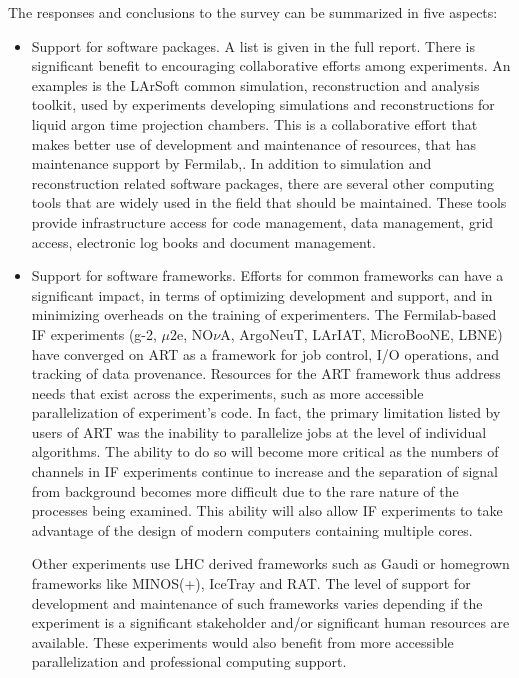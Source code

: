 The responses and conclusions to the survey can be summarized in five aspects:  
\begin{itemize}

\item Support for software packages. A list is given in the full report. There
is significant benefit to encouraging collaborative efforts among experiments.
An examples is the LArSoft common simulation, reconstruction and
analysis toolkit, used by experiments developing simulations and
reconstructions for liquid argon time projection chambers. This is a
collaborative effort that makes better use of development and maintenance of resources, that has maintenance support by Fermilab,. 
In addition to simulation and reconstruction related software packages, there are
several other computing tools that are widely used in the field that should be
maintained.  These tools provide infrastructure access for code management,
data management, grid access, electronic log books and document management.

\item Support for software frameworks.
Efforts for common frameworks can have a significant impact, in terms of optimizing 
development and support, and in minimizing overheads on the training of experimenters. 
The Fermilab-based IF experiments (g-2, $\mu2$e, NO$\nu$A, ArgoNeuT, LArIAT, MicroBooNE, LBNE) have converged on ART as a framework for job control, I/O operations, and tracking of data provenance. Resources for the ART framework thus address needs that exist across the experiments, such as more accessible parallelization of experiment's code. In fact, the primary limitation listed by users of ART was the inability to parallelize jobs at the level of individual algorithms.  The ability to do so will become more critical as the numbers of channels in IF experiments continue to increase and the separation of signal from background becomes more difficult due to the rare nature of the processes being examined.  This ability will also allow IF experiments to take advantage of the design of modern computers containing multiple cores.

Other experiments use LHC derived frameworks such as Gaudi or homegrown frameworks like MINOS(+), IceTray and RAT. The level of support for development and maintenance of such frameworks varies depending if the experiment is a significant stakeholder and/or significant human resources are available. These experiments would also benefit from more accessible parallelization and professional computing support.


\end{itemize}
